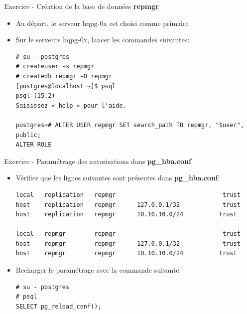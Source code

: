 
\begin{frame}[fragile]{Exercice - Création de la base de données \textbf{repmgr}}

   \begin{itemize}
      \item Au départ, le serveur hqpg-0x est choisi comme primaire
      \item Sur le serveurs hqpg-0x, lancer les commandes suivantes:
\begin{tiny}
\begin{Verbatim}[commandchars=\\\{\}]
# su - postgres
# createuser -s repmgr
# createdb repmgr -O repmgr
[postgres@localhost ~]$ psql
psql (15.2)
Saisissez « help » pour l'aide.

postgres=# ALTER USER repmgr SET search_path TO repmgr, "$user", public;
ALTER ROLE
\end{Verbatim}
\end{tiny}
   \end{itemize}

\end{frame}


\begin{frame}[fragile]{Exercice - Paramétrage des autorisations dans \textbf{pg\_hba.conf}}

   \begin{itemize}
      \item Vérifier que les lignes suivantes sont présentes dans \textbf{pg\_hba.conf}:
\begin{tiny}
\begin{Verbatim}[commandchars=\\\{\}]
local   replication   repmgr                              trust
host    replication   repmgr      127.0.0.1/32            trust
host    replication   repmgr      10.10.10.0/24          trust

local   repmgr        repmgr                              trust
host    repmgr        repmgr      127.0.0.1/32            trust
host    repmgr        repmgr      10.10.10.0/24          trust
\end{Verbatim}
\end{tiny}
      \item Recharger le paramétrage avec la commande suivante:
\begin{tiny}
\begin{Verbatim}[commandchars=\\\{\}]
# su - postgres
# psql
SELECT pg_reload_conf();
\end{Verbatim}
\end{tiny}
   \end{itemize}

\end{frame}

